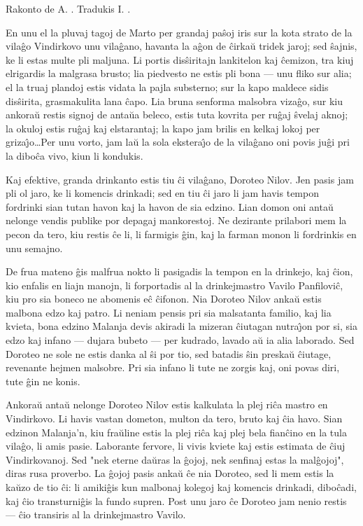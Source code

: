 \begin{center}
\footnotesize Rakonto de A. . Tradukis I. .
\end{center}

   En unu el la pluvaj tagoj de Marto per grandaj pa\^soj iris sur la
kota strato de la vila\^go Vindirkovo unu vila\^gano, havanta la
a\^gon de \^cirka\u u tridek jaroj; sed \^sajnis, ke li estas multe
pli maljuna. Li portis dis\^siritajn lankitelon kaj \^cemizon, tra
kiuj elrigardis la malgrasa brusto; lia piedvesto ne estis pli bona
--- unu fliko sur alia; el la truaj plandoj estis vidata la pajla
substerno; sur la kapo maldece sidis dis\^sirita, grasmakulita lana
\^capo. Lia bruna senforma malsobra viza\^go, sur kiu ankora\u u
restis signoj de anta\u ua beleco, estis tuta kovrita per ru\^gaj
\^svelaj aknoj; la okuloj estis ru\^gaj kaj elstarantaj; la kapo jam
brilis en kelkaj lokoj per griza\^{\j}o\dots Per unu vorto, jam la\u
u la sola ekstera\^{\j}o de la vila\^gano oni povis ju\^gi pri la
dibo\^ca vivo, kiun li kondukis.

   Kaj efektive, granda drinkanto estis tiu \^ci vila\^gano, Doroteo
Nilov. Jen pasis jam pli ol jaro, ke li komencis drinkadi; sed en
tiu \^ci jaro li jam havis tempon fordrinki sian tutan havon kaj la
havon de sia edzino. Lian domon oni anta\u u nelonge vendis publike
por depagaj mankorestoj. Ne dezirante prilabori mem la pecon da
tero, kiu restis \^ce li, li farmigis \^gin, kaj la farman monon li
fordrinkis en unu semajno.

   De frua mateno \^gis malfrua nokto li pasigadis la tempon en la
drinkejo, kaj \^cion, kio enfalis en liajn manojn, li forportadis al
la drinkejmastro Vavilo Panfilovi\^c, kiu pro sia boneco ne abomenis
e\^c \^cifonon. Nia Doroteo Nilov anka\u u estis malbona edzo kaj
patro. Li neniam pensis pri sia malsatanta familio, kaj lia kvieta,
bona edzino Malanja devis akiradi la mizeran \^ciutagan
nutra\^{\j}on por si, sia edzo kaj infano --- dujara bubeto --- per
kudrado, lavado a\u u ia alia laborado. Sed Doroteo ne sole ne estis
danka al \^si por tio, sed batadis \^sin preska\u u \^ciutage,
revenante hejmen malsobre. Pri sia infano li tute ne zorgis kaj, oni
povas diri, tute \^gin ne konis.

   Ankora\u u anta\u u nelonge Doroteo Nilov estis kalkulata la plej ri\^ca
mastro en Vindirkovo. Li havis vastan dometon, multon da tero, bruto
kaj \^cia havo. Sian edzinon Malanja'n, kiu fra\u uline estis la
plej ri\^ca kaj plej bela fian\^cino en la tula vila\^go, li amis
pasie. Laborante fervore, li vivis kviete kaj estis estimata de
\^ciuj Vindirkovanoj. Sed "nek eterne da\u uras la \^gojoj, nek
senfinaj estas la mal\^gojoj", diras rusa proverbo. La \^gojoj
pasis anka\u u \^ce nia Doroteo, sed li mem estis la ka\u uzo de tio
\^ci: li amiki\^gis kun malbonaj kolegoj kaj komencis drinkadi,
dibo\^cadi, kaj \^cio transturni\^gis la fundo supren. Post unu jaro
\^ce Doroteo jam nenio restis --- \^cio transiris al la
drinkejmastro Vavilo.

